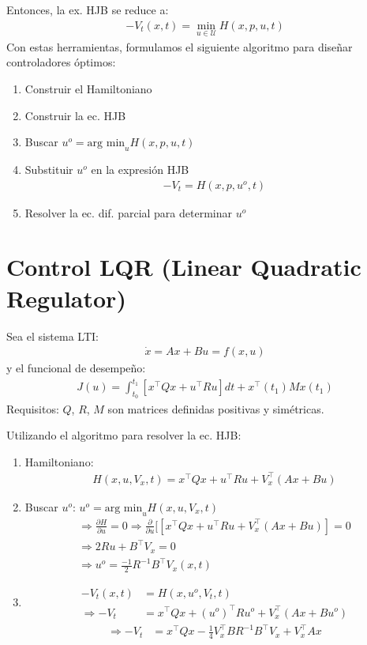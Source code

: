 \par Entonces, la ex. HJB se reduce a:
\begin{align*}
    -V_t(x,t)=\min_{u\in\mathcal{U}}H(x,p,u,t)
\end{align*}
Con estas herramientas, formulamos el siguiente algoritmo para diseñar controladores óptimos:
\begin{enumerate}
    \item Construir el Hamiltoniano
    \item Construir la ec. HJB
    \item Buscar $u^o=\text{arg min}_u H(x,p,u,t)$
    \item Substituir $u^o$ en la expresión HJB
    \begin{align*}
        -V_t=H(x,p,u^o,t)
    \end{align*}
    \item Resolver la ec. dif. parcial para determinar $u^o$
\end{enumerate}

\section{Control LQR (Linear Quadratic Regulator)}
Sea el sistema LTI:
\begin{align*}
    \dot{x}=Ax+Bu=f(x,u)
\end{align*}
y el funcional de desempeño:
\begin{align*}
    J(u)=\int_{t_0}^{t_1}[x^\top Q x+u^\top Ru]dt+x^\top(t_1)Mx(t_1)
\end{align*}
Requisitos: $Q$, $R$, $M$ son matrices definidas positivas y simétricas.\\
\par Utilizando el algoritmo para resolver la ec. HJB:
\begin{enumerate}
    \item[1.] Hamiltoniano:
    \begin{align*}
        H(x,u,V_x,t)=x^\top Qx+u^\top Ru+V^\top_x(Ax+Bu)
    \end{align*}
    \item[3.] Buscar $u^o$: $u^o=\text{arg min}_u H(x,u,V_x,t)$
    \begin{align*}
        \Longrightarrow \frac{\partial H}{\partial u}=0 \Longrightarrow \frac{\partial}{\partial u}[[x^\top Q x+u^\top Ru +V_x^\top(Ax+Bu)]=0\\
        \Longrightarrow 2Ru+B^\top V_x=0\\
        \Longrightarrow u^o=\frac{-1}{2}R^{-1}B^\top V_x(x,t)
    \end{align*}
    \item[2. y 4.] \begin{align*}
        -V_t(x,t) &= H(x,u^o,V_t,t)\\
        \Longrightarrow -V_t &= x^\top Qx+(u^o)^\top Ru^o+V_x^\top (Ax+Bu^o)
    \end{align*} 
    \begin{align}
        \Longrightarrow -V_t &= x^\top Qx-\frac{1}{4}V_x^\top BR^{-1}B^\top V_x+V_x^\top Ax
    \end{align}
\end{enumerate}

